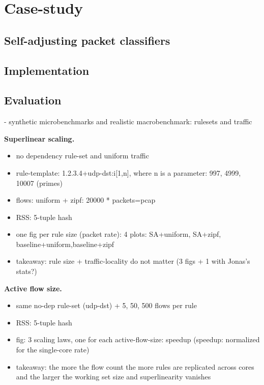\section{Case-study }\label{sec:case-study}

\subsection{Self-adjusting packet classifiers}
\label{sec:sa-nf-tables}

\subsection{Implementation}
\label{sec:sa-nf-tables-impl}

\subsection{Evaluation}
\label{sec:sa-nf-tables-eval}

- synthetic microbenchmarks and realistic macrobenchmark: rulesets and traffic

\noindent%
\textbf{Superlinear scaling.} %
\begin{itemize}
\item no dependency rule-set and uniform traffic
\item rule-template: 1.2.3.4+udp-dst:i[1,n], where n is a parameter: 997, 4999, 10007 (primes)
\item flows: uniform + zipf: 20000 * packets=pcap
\item RSS: 5-tuple hash
\item one fig per rule size (packet rate): 4 plots: SA+uniform, SA+zipf, baseline+uniform,baseline+zipf
\item takeaway: rule size + traffic-locality do not matter (3 figs + 1 with Jonas's stats?)
\end{itemize}

\noindent%
\textbf{Active flow size.} %
\begin{itemize}
\item same no-dep rule-set (udp-dst) + 5, 50, 500 flows per rule
\item RSS: 5-tuple hash
\item fig: 3 scaling laws, one for each active-flow-size: speedup (speedup: normalized for the single-core rate)
\item takeaway: the more the flow count the more rules are replicated across cores and the larger the working set size and superlinearity vanishes
\end{itemize}


